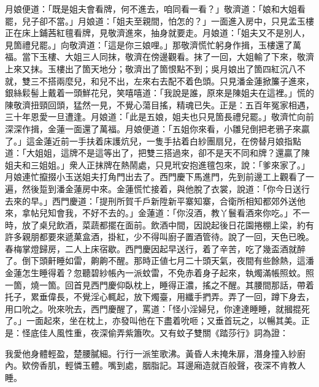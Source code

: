 月娘便道：「既是姐夫會看牌，何不進去，咱同看一看？」{}敬濟道：「娘和大姐看罷，兒子卻不當。」{}月娘道：「姐夫至親間，怕怎的？」一面進入房中，只見孟玉樓正在床上鋪茜紅氊看牌，見敬濟進來，抽身就要走。月娘道：「姐夫又不是別人，見箇禮兒罷。」{}向敬濟道：「這是你三娘哩。」那敬濟慌忙躬身作揖，玉樓還了萬福。當下玉樓、大姐三人同抹，敬濟在傍邊觀看。抹了一回，大姐輸了下來，敬濟上來又抹。玉樓出了箇天地分；敬濟出了箇恨點不到；吳月娘出了箇四紅沉八不就，雙三不搭兩麼兒，和兒不出，左來右去配不着色頭。只見潘金蓮掀簾子進來，銀絲鬏髻上戴着一頭鮮花兒，{}笑嘻嘻道：「我說是誰，原來是陳姐夫在這裡。」{}慌的陳敬濟扭頸回頭，猛然一見，不覺心蕩目搖，精魂已失。正是：五百年冤家相遇，三十年恩愛一旦遭逢。月娘道：「此是五娘，姐夫也只見箇長禮兒罷。」敬濟忙向前深深作揖，金蓮一面還了萬福。月娘便道：「五姐你來看，小雛兒倒把老鴉子來贏了。」這金蓮近前一手扶着床護炕兒，一隻手拈着白紗團扇兒，在傍替月娘指點道：「大姐姐，這牌不是這等出了，把雙三搭過來，卻不是天不同和牌？還贏了陳姐夫和三姐姐。」衆人正抹牌在熱鬧處，只見玳安抱進氊包來，說：「爹來家了。」月娘連忙攛掇小玉送姐夫打角門出去了。{}西門慶下馬進門，先到前邊工上觀看了一遍，然後踅到潘金蓮房中來。金蓮慌忙接着，與他脫了衣裳，說道：「你今日送行去來的早。」西門慶道：「提刑所賀千戶新陞新平寨知寨，合衛所相知都郊外送他來，拿帖兒知會我，不好不去的。」金蓮道：「你沒酒，教丫鬟看酒來你吃。」不一時，放了桌兒飲酒，菜蔬都擺在面前。飲酒中間，因說起後日花園捲棚上梁，約有許多親朋都要來遞菓盒酒，掛紅，少不得叫廚子置酒管待。說了一回，天色已晚。春梅掌燈歸房，二人上床宿歇。西門慶因起早送行，着了辛苦，吃了幾盃酒就醉了。倒下頭鼾睡如雷，齁齁不醒。那時正値七月二十頭天氣，夜間有些餘熱，這潘金蓮怎生睡得着？忽聽碧紗帳內一派蚊雷，不免赤着身子起來，執燭滿帳照蚊。照一箇，燒一箇。回首見西門慶仰臥枕上，睡得正濃，搖之不醒。其腰間那話，帶着托子，累垂偉長，不覺淫心輒起，放下燭臺，用纖手捫弄。{}弄了一回，蹲下身去，用口吮之。吮來吮去，西門慶醒了，罵道：「怪小淫婦兒，你達達睡睡，就摑掍死了。」一面起來，坐在枕上，亦發叫他在下盡着吮咂；又垂首玩之，以暢其美。正是：怪底佳人風性重，夜深偷弄紫簫吹。又有蚊子雙關《踏莎行》詞為證：

\begin{myquote}
我愛他身體輕盈，楚腰膩細。行行一派笙歌沸。黃昏人未掩朱扉，潛身撞入紗廚內。欵傍香肌，輕憐玉體。嘴到處，胭脂記。耳邊廂造就百般聲，夜深不肯教人睡。
\end{myquote}

